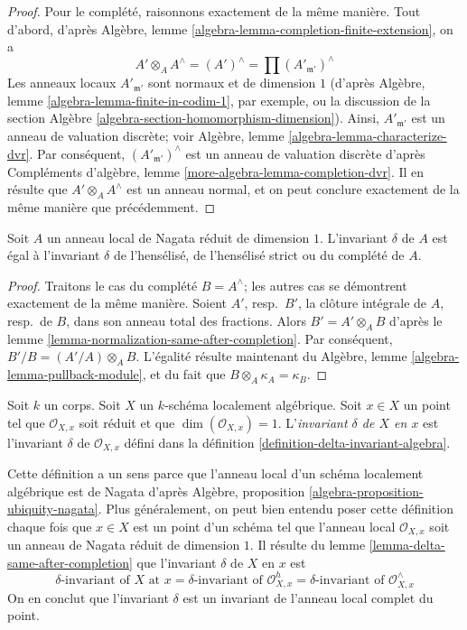 \begin{proof}
\medskip\noindent
Pour le complété, raisonnons exactement de la même manière. Tout d'abord,
d'après Algèbre, lemme \ref{algebra-lemma-completion-finite-extension}, on a
$$
A' \otimes_A A^\wedge = (A')^\wedge =
\prod\nolimits (A'_{\mathfrak m'})^\wedge
$$
Les anneaux locaux $A'_{\mathfrak m'}$ sont normaux et de dimension $1$
(d'après Algèbre, lemme \ref{algebra-lemma-finite-in-codim-1}, par exemple, ou
la discussion de la
section Algèbre \ref{algebra-section-homomorphism-dimension}).
Ainsi, $A'_{\mathfrak m'}$ est un anneau de valuation discrète; voir
Algèbre, lemme \ref{algebra-lemma-characterize-dvr}.
Par conséquent, $(A'_{\mathfrak m'})^\wedge$ est un anneau de valuation discrète
d'après Compléments d'algèbre, lemme \ref{more-algebra-lemma-completion-dvr}.
Il en résulte que $A' \otimes_A A^\wedge$ est un anneau normal, et
on peut conclure exactement de la même manière que précédemment.
\end{proof}

\begin{lemma}
\label{lemma-delta-same-after-completion}
Soit $A$ un anneau local de Nagata réduit de dimension $1$.
L'invariant $\delta$ de $A$ est égal à
l'invariant $\delta$ de l'hensélisé, de l'hensélisé strict
ou du complété de $A$.
\end{lemma}

\begin{proof}
Traitons le cas du complété $B = A^\wedge$;
les autres cas se démontrent exactement de la même manière.
Soient $A'$, resp.\ $B'$, la clôture intégrale de $A$, resp.\ de $B$,
dans son anneau total des fractions.
Alors $B' = A' \otimes_A B$ d'après le
lemme \ref{lemma-normalization-same-after-completion}.
Par conséquent, $B'/B = (A'/A) \otimes_A B$.
L'égalité résulte maintenant du
Algèbre, lemme \ref{algebra-lemma-pullback-module},
et du fait que $B \otimes_A \kappa_A = \kappa_B$.
\end{proof}

\begin{definition}
\label{definition-delta-invariant}
Soit $k$ un corps. Soit $X$ un $k$-schéma localement algébrique.
Soit $x \in X$ un point tel que $\mathcal{O}_{X, x}$
soit réduit et que $\dim(\mathcal{O}_{X, x}) = 1$.
L'{\it invariant $\delta$ de $X$ en $x$} est
l'invariant $\delta$ de $\mathcal{O}_{X, x}$ défini dans la
définition \ref{definition-delta-invariant-algebra}.
\end{definition}

\noindent
Cette définition a un sens parce que l'anneau local d'un schéma localement
algébrique est de Nagata d'après
Algèbre, proposition \ref{algebra-proposition-ubiquity-nagata}.
Plus généralement, on peut bien entendu poser cette définition
chaque fois que $x \in X$ est un point d'un schéma tel que
l'anneau local $\mathcal{O}_{X, x}$ soit un anneau de Nagata réduit de dimension $1$.
Il résulte du lemme \ref{lemma-delta-same-after-completion}
que l'invariant $\delta$ de $X$ en $x$ est
$$
\delta\text{-invariant of }X\text{ at }x =
\delta\text{-invariant of }\mathcal{O}_{X, x}^h =
\delta\text{-invariant of }\mathcal{O}_{X, x}^\wedge
$$
On en conclut que l'invariant $\delta$ est un invariant
de l'anneau local complet du point.

